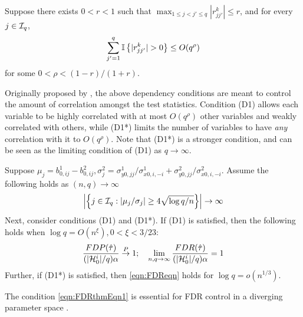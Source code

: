  Suppose there exists $0 < r < 1$ such that $\max_{1 \leq j < j' \leq q} | r_{jj'}^k | \leq r$, and for every $j \in {\cal{I}}_q$,
%
$$
\sum_{j'=1}^q {\mathbb{I}} \left\{ |r_{jj'}^k| > 0 \right\} \leq O(q^\rho)
$$
%
for some $0 < \rho < (1-r)/(1+r)$.

Originally proposed by \citet{LiuShao14}, the above dependency conditions are meant to control the amount of correlation amongst the test statistics. Condition (D1) allows each variable to be highly correlated with at most $O(q^\rho)$ other variables and weakly correlated with others, while (D1*) limits the number of variables to have {\it any} correlation with it to $O(q^\rho)$. Note that (D1*) is a stronger condition, and can be seen as the limiting condition of (D1) as $q \rightarrow \infty$.

\begin{theorem}\label{thm:FDRthm}
Suppose $\mu_j = b_{0,ij}^1 - b_{0,ij}^2, \sigma_j^2 = \sigma_{y0,jj}^1/ \sigma_{x0,i,-i}^1 + \sigma_{y0,jj}^2/ \sigma_{x0,i,-i}^2$. Assume the following holds as $(n,q) \rightarrow \infty$
%
\begin{align}\label{eqn:FDRthmEqn1}
\left| \left\{ j \in {\cal{I}}_q: |\mu_j / \sigma_j | \geq
4 \sqrt{ \log q/n} \right\} \right| \rightarrow \infty
\end{align}
%
Next, consider conditions (D1) and (D1*). If (D1) is satisfied, then the following holds when $\log q = O(n^{\xi}), 0 < \xi < 3/23$:
%
\begin{align}\label{eqn:FDReqn}
\frac{FDP( \hat \tau)}{(| {\cal{H}}_0^i|/q) \alpha} \stackrel{P}{\rightarrow} 1; \quad
\lim_{n, q \rightarrow \infty} \frac{FDR( \hat \tau)}{(| {\cal{H}}_0^i|/q) \alpha} = 1
\end{align}
%
Further, if (D1*) is satisfied, then \eqref{eqn:FDReqn} holds for $\log q = o(n^{1/3})$.
\end{theorem}
%
The condition \eqref{eqn:FDRthmEqn1} is essential for FDR control in a diverging parameter space \citep{LiuShao14, Liu17}.

